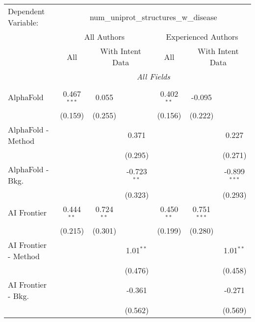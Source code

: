\begingroup
\centering
\begin{tabular}{lcccccc}
   \tabularnewline \midrule \midrule
   Dependent Variable: & \multicolumn{6}{c}{num\_uniprot\_structures\_w\_disease}\\
 & \multicolumn{3}{c}{All Authors} & \multicolumn{3}{c}{Experienced Authors} \\
\cmidrule(lr){2-4} \cmidrule(lr){5-7}
 & \multicolumn{1}{c}{All} & \multicolumn{2}{c}{With Intent Data} & \multicolumn{1}{c}{All} & \multicolumn{2}{c}{With Intent Data} \\
\cmidrule(lr){2-2} \cmidrule(lr){3-4} \cmidrule(lr){5-5} \cmidrule(lr){6-7}
 & \multicolumn{6}{c}{\textit{All Fields}} \\ \\
   AlphaFold            & 0.467$^{***}$ & 0.055        &               & 0.402$^{**}$ & -0.095        &   \\   
                        & (0.159)       & (0.255)      &               & (0.156)      & (0.222)       &   \\   
   AlphaFold - Method   &               &              & 0.371         &              &               & 0.227\\   
                        &               &              & (0.295)       &              &               & (0.271)\\   
   AlphaFold - Bkg.     &               &              & -0.723$^{**}$ &              &               & -0.899$^{***}$\\   
                        &               &              & (0.323)       &              &               & (0.293)\\   
   AI Frontier          & 0.444$^{**}$  & 0.724$^{**}$ &               & 0.450$^{**}$ & 0.751$^{***}$ &   \\   
                        & (0.215)       & (0.301)      &               & (0.199)      & (0.280)       &   \\   
   AI Frontier - Method &               &              & 1.01$^{**}$   &              &               & 1.01$^{**}$\\   
                        &               &              & (0.476)       &              &               & (0.458)\\   
   AI Frontier - Bkg.   &               &              & -0.361        &              &               & -0.271\\   
                        &               &              & (0.562)       &              &               & (0.569)\\   

\end{tabular}
